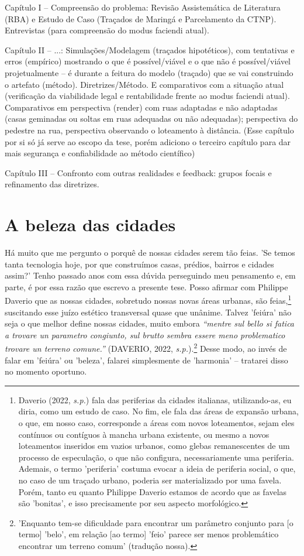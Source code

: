 \documentclass[]{report}
\begin{document}
	Capítulo I – Compreensão do problema: Revisão Assistemática de Literatura (RBA) e Estudo de Caso (Traçados de Maringá e Parcelamento da CTNP). Entrevistas (para compreensão do modus faciendi atual).

	Capítulo II – ...: Simulações/Modelagem (traçados hipotéticos), com tentativas e erros (empírico) mostrando o que é possível/viável e o que não é possível/viável projetualmente – é durante a feitura do modelo (traçado) que se vai construindo o artefato (método). Diretrizes/Método. E comparativos com a situação atual (verificação da viabilidade legal e rentabilidade frente ao modus faciendi atual). Comparativos em perspectiva (render) com ruas adaptadas e não adaptadas (casas geminadas ou soltas em ruas adequadas ou não adequadas); perspectiva do pedestre na rua, perspectiva observando o loteamento à distância. (Esse capítulo por si só já serve ao escopo da tese, porém adiciono o terceiro capítulo para dar mais segurança e confiabilidade ao método científico)

	Capítulo III – Confronto com outras realidades e feedback: grupos focais e refinamento das diretrizes.

	\section{A beleza das cidades}

	Há muito que me pergunto o porquê de nossas cidades serem tão feias. 'Se temos tanta tecnologia hoje, por que construímos casas, prédios, bairros e cidades assim?' Tenho passado anos com essa dúvida perseguindo meu pensamento e, em parte, é por essa razão que escrevo a presente tese. Posso afirmar com Philippe Daverio que as nossas cidades, sobretudo nossas novas áreas urbanas, são feias,\footnote[1]{Daverio (2022, \textit{s.p.}) fala das periferias da cidades italianas, utilizando-as, eu diria, como um estudo de caso. No fim, ele fala das áreas de expansão urbana, o que, em nosso caso, corresponde a áreas com novos loteamentos, sejam eles contínuos ou contíguos à mancha urbana existente, ou mesmo a novos loteamentos inseridos em vazios urbanos, como glebas remanescentes de um processo de especulação, o que não configura, necessariamente uma periferia. Ademais, o termo 'periferia' costuma evocar a ideia de periferia social, o que, no caso de um traçado urbano, poderia ser materializado por uma favela. Porém, tanto eu quanto Philippe Daverio estamos de acordo que as favelas são 'bonitas', e isso precisamente por seu aspecto morfológico.} suscitando esse juízo estético transversal quase que unânime. Talvez 'feiúra' não seja o que melhor define nossas cidades, muito embora \textit{“mentre sul bello si fatica a trovare un parametro congiunto, sul brutto sembra essere meno problematico trovare un terreno comune.”} (DAVERIO, 2022, \textit{s.p.}).\footnote[2]{'Enquanto tem-se dificuldade para encontrar um parâmetro conjunto para [o termo] 'belo', em relação [ao termo] 'feio' parece ser menos problemático encontrar um terreno comum' (tradução nossa).} Desse modo, ao invés de falar em 'feiúra' ou 'beleza', falarei simplesmente de 'harmonia' – tratarei disso no momento oportuno. 
	
\end{document}
